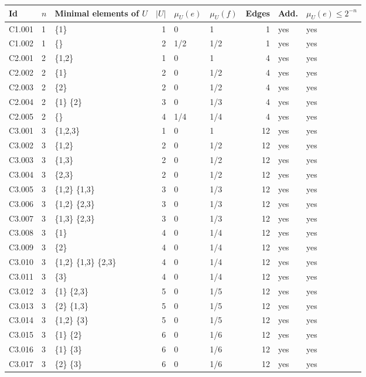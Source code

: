 {\scriptsize\setlength{\tabcolsep}{3pt}
\begin{longtable}{@{}llp{6.2cm}rllrll@{}}
\toprule
Id & $n$ & Minimal elements of $U$ & $|U|$ & $\mu_U(e)$ & $\mu_U(f)$ & Edges & Add. & $\mu_U(e)\le 2^{-n}$ \\
\midrule\endhead
\bottomrule\endfoot
C1.001 & 1 & \{1\} & 1 & 0 & 1 & 1 & yes & yes \\
C1.002 & 1 & \{\} & 2 & 1/2 & 1/2 & 1 & yes & yes \\
C2.001 & 2 & \{1,2\} & 1 & 0 & 1 & 4 & yes & yes \\
C2.002 & 2 & \{1\} & 2 & 0 & 1/2 & 4 & yes & yes \\
C2.003 & 2 & \{2\} & 2 & 0 & 1/2 & 4 & yes & yes \\
C2.004 & 2 & \{1\} \{2\} & 3 & 0 & 1/3 & 4 & yes & yes \\
C2.005 & 2 & \{\} & 4 & 1/4 & 1/4 & 4 & yes & yes \\
C3.001 & 3 & \{1,2,3\} & 1 & 0 & 1 & 12 & yes & yes \\
C3.002 & 3 & \{1,2\} & 2 & 0 & 1/2 & 12 & yes & yes \\
C3.003 & 3 & \{1,3\} & 2 & 0 & 1/2 & 12 & yes & yes \\
C3.004 & 3 & \{2,3\} & 2 & 0 & 1/2 & 12 & yes & yes \\
C3.005 & 3 & \{1,2\} \{1,3\} & 3 & 0 & 1/3 & 12 & yes & yes \\
C3.006 & 3 & \{1,2\} \{2,3\} & 3 & 0 & 1/3 & 12 & yes & yes \\
C3.007 & 3 & \{1,3\} \{2,3\} & 3 & 0 & 1/3 & 12 & yes & yes \\
C3.008 & 3 & \{1\} & 4 & 0 & 1/4 & 12 & yes & yes \\
C3.009 & 3 & \{2\} & 4 & 0 & 1/4 & 12 & yes & yes \\
C3.010 & 3 & \{1,2\} \{1,3\} \{2,3\} & 4 & 0 & 1/4 & 12 & yes & yes \\
C3.011 & 3 & \{3\} & 4 & 0 & 1/4 & 12 & yes & yes \\
C3.012 & 3 & \{1\} \{2,3\} & 5 & 0 & 1/5 & 12 & yes & yes \\
C3.013 & 3 & \{2\} \{1,3\} & 5 & 0 & 1/5 & 12 & yes & yes \\
C3.014 & 3 & \{1,2\} \{3\} & 5 & 0 & 1/5 & 12 & yes & yes \\
C3.015 & 3 & \{1\} \{2\} & 6 & 0 & 1/6 & 12 & yes & yes \\
C3.016 & 3 & \{1\} \{3\} & 6 & 0 & 1/6 & 12 & yes & yes \\
C3.017 & 3 & \{2\} \{3\} & 6 & 0 & 1/6 & 12 & yes & yes \\

\end{longtable}}
